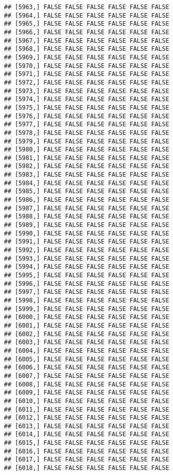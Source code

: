 \documentclass[
]{article}
\begin{document}
\begin{verbatim}
## [5963,] FALSE FALSE FALSE FALSE FALSE FALSE
## [5964,] FALSE FALSE FALSE FALSE FALSE FALSE
## [5965,] FALSE FALSE FALSE FALSE FALSE FALSE
## [5966,] FALSE FALSE FALSE FALSE FALSE FALSE
## [5967,] FALSE FALSE FALSE FALSE FALSE FALSE
## [5968,] FALSE FALSE FALSE FALSE FALSE FALSE
## [5969,] FALSE FALSE FALSE FALSE FALSE FALSE
## [5970,] FALSE FALSE FALSE FALSE FALSE FALSE
## [5971,] FALSE FALSE FALSE FALSE FALSE FALSE
## [5972,] FALSE FALSE FALSE FALSE FALSE FALSE
## [5973,] FALSE FALSE FALSE FALSE FALSE FALSE
## [5974,] FALSE FALSE FALSE FALSE FALSE FALSE
## [5975,] FALSE FALSE FALSE FALSE FALSE FALSE
## [5976,] FALSE FALSE FALSE FALSE FALSE FALSE
## [5977,] FALSE FALSE FALSE FALSE FALSE FALSE
## [5978,] FALSE FALSE FALSE FALSE FALSE FALSE
## [5979,] FALSE FALSE FALSE FALSE FALSE FALSE
## [5980,] FALSE FALSE FALSE FALSE FALSE FALSE
## [5981,] FALSE FALSE FALSE FALSE FALSE FALSE
## [5982,] FALSE FALSE FALSE FALSE FALSE FALSE
## [5983,] FALSE FALSE FALSE FALSE FALSE FALSE
## [5984,] FALSE FALSE FALSE FALSE FALSE FALSE
## [5985,] FALSE FALSE FALSE FALSE FALSE FALSE
## [5986,] FALSE FALSE FALSE FALSE FALSE FALSE
## [5987,] FALSE FALSE FALSE FALSE FALSE FALSE
## [5988,] FALSE FALSE FALSE FALSE FALSE FALSE
## [5989,] FALSE FALSE FALSE FALSE FALSE FALSE
## [5990,] FALSE FALSE FALSE FALSE FALSE FALSE
## [5991,] FALSE FALSE FALSE FALSE FALSE FALSE
## [5992,] FALSE FALSE FALSE FALSE FALSE FALSE
## [5993,] FALSE FALSE FALSE FALSE FALSE FALSE
## [5994,] FALSE FALSE FALSE FALSE FALSE FALSE
## [5995,] FALSE FALSE FALSE FALSE FALSE FALSE
## [5996,] FALSE FALSE FALSE FALSE FALSE FALSE
## [5997,] FALSE FALSE FALSE FALSE FALSE FALSE
## [5998,] FALSE FALSE FALSE FALSE FALSE FALSE
## [5999,] FALSE FALSE FALSE FALSE FALSE FALSE
## [6000,] FALSE FALSE FALSE FALSE FALSE FALSE
## [6001,] FALSE FALSE FALSE FALSE FALSE FALSE
## [6002,] FALSE FALSE FALSE FALSE FALSE FALSE
## [6003,] FALSE FALSE FALSE FALSE FALSE FALSE
## [6004,] FALSE FALSE FALSE FALSE FALSE FALSE
## [6005,] FALSE FALSE FALSE FALSE FALSE FALSE
## [6006,] FALSE FALSE FALSE FALSE FALSE FALSE
## [6007,] FALSE FALSE FALSE FALSE FALSE FALSE
## [6008,] FALSE FALSE FALSE FALSE FALSE FALSE
## [6009,] FALSE FALSE FALSE FALSE FALSE FALSE
## [6010,] FALSE FALSE FALSE FALSE FALSE FALSE
## [6011,] FALSE FALSE FALSE FALSE FALSE FALSE
## [6012,] FALSE FALSE FALSE FALSE FALSE FALSE
## [6013,] FALSE FALSE FALSE FALSE FALSE FALSE
## [6014,] FALSE FALSE FALSE FALSE FALSE FALSE
## [6015,] FALSE FALSE FALSE FALSE FALSE FALSE
## [6016,] FALSE FALSE FALSE FALSE FALSE FALSE
## [6017,] FALSE FALSE FALSE FALSE FALSE FALSE
## [6018,] FALSE FALSE FALSE FALSE FALSE FALSE

\end{verbatim}
\end{document}
